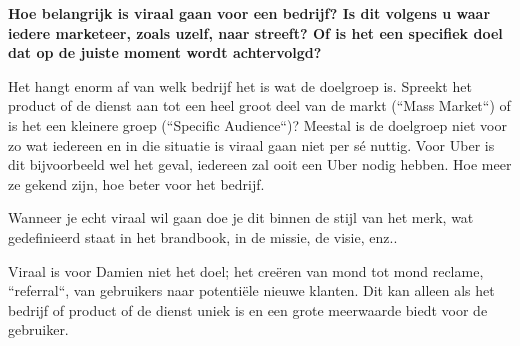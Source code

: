 \textbf{Hoe belangrijk is viraal gaan voor een bedrijf? Is dit volgens u waar iedere marketeer, zoals uzelf, naar streeft? Of is het een specifiek doel dat op de juiste moment wordt achtervolgd?}
	
Het hangt enorm af van welk bedrijf het is wat de doelgroep is. Spreekt het product of de dienst aan tot een heel groot deel van de markt (``Mass Market``) of is het een kleinere groep (``Specific Audience``)? Meestal is de doelgroep niet voor zo wat iedereen en in die situatie is viraal gaan niet per sé nuttig. Voor Uber is dit bijvoorbeeld wel het geval, iedereen zal ooit een Uber nodig hebben. Hoe meer ze gekend zijn, hoe beter voor het bedrijf.

Wanneer je echt viraal wil gaan doe je dit binnen de stijl van het merk, wat gedefinieerd staat in het brandbook, in de missie, de visie, enz..

Viraal is voor Damien niet het doel; het creëren van mond tot mond reclame, ``referral``, van gebruikers naar potentiële nieuwe klanten. Dit kan alleen als het bedrijf of product of de dienst uniek is en een grote meerwaarde biedt voor de gebruiker.
	
